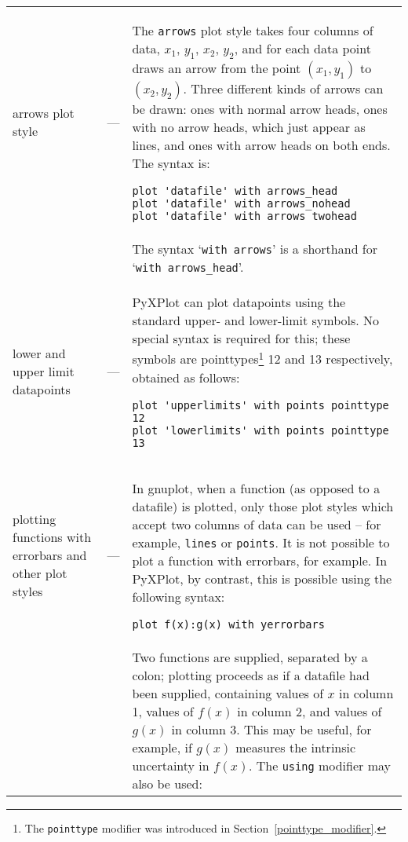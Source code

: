 \documentclass[a4paper,onecolumn,11pt]{book}
\begin{document}
\begin{longtable}{p{3cm}lp{9cm}}
arrows plot style\index{arrows plot style@\texttt{arrows} plot
style}\label{arrows_plot_style} & --- & The \texttt{arrows} plot style takes
four columns of data, $x_1$, $y_1$, $x_2$, $y_2$, and for each data point draws
an arrow from the point $(x_1,y_1)$ to $(x_2,y_2)$.  Three different kinds of
arrows can be drawn: ones with normal arrow heads, ones with no arrow heads,
which just appear as lines, and ones with arrow heads on both ends. The syntax
is:

\begin{verbatim}
plot 'datafile' with arrows_head
plot 'datafile' with arrows_nohead
plot 'datafile' with arrows_twohead
\end{verbatim}
\\ & &
The syntax `\texttt{with arrows}' is a shorthand for `\texttt{with arrows\_head}'.\\

lower and upper limit datapoints & --- & PyXPlot can plot datapoints using the
standard upper- and lower-limit symbols.\index{lower-limit
datapoints}\index{upper-limit datapoints} No special syntax is required for
this; these symbols are pointtypes\footnote{The \texttt{pointtype} modifier was
introduced in Section~\ref{pointtype_modifier}.} 12 and 13 respectively,
obtained as follows:

\begin{verbatim}
plot 'upperlimits' with points pointtype 12
plot 'lowerlimits' with points pointtype 13
\end{verbatim}
\\

plotting functions with errorbars and other plot styles & --- & In gnuplot,
when a function (as opposed to a datafile) is plotted, only those plot styles
which accept two columns of data can be used -- for example, \texttt{lines} or
\texttt{points}. It is not possible to plot a function with errorbars, for
example. In PyXPlot, by contrast, this is possible using the following syntax:

\begin{verbatim}
plot f(x):g(x) with yerrorbars
\end{verbatim}
\\ & &

Two functions are supplied, separated by a colon; plotting proceeds as if a
datafile had been supplied, containing values of $x$ in column 1, values of
$f(x)$ in column 2, and values of $g(x)$ in column 3. This may be useful, for
example, if $g(x)$ measures the intrinsic uncertainty in $f(x)$. The
\texttt{using} modifier may also be used:


\end{longtable}
\end{document}
